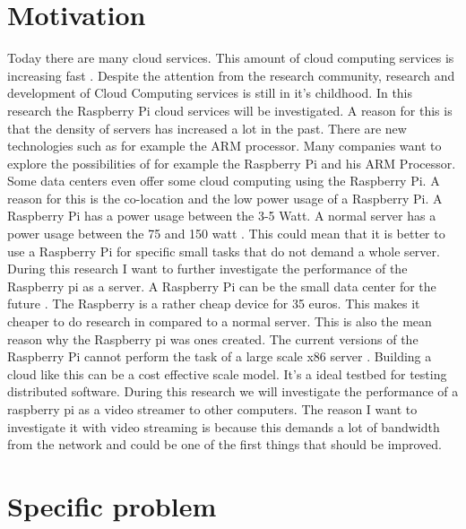 \documentclass{sig-alternate-br}
\begin{document}

\section{Motivation}
Today there are many cloud services. This amount of cloud computing services is increasing fast \cite{armbrust:2009}.  Despite the attention
from the research community, research and development of
Cloud Computing services is still in it's childhood\cite{tso:2013}. 
In this research the Raspberry Pi cloud services will be investigated. A reason for this is that the density of servers has increased a lot in the past\cite{density}. There are new technologies such as for example the ARM processor. Many companies want to explore the possibilities of for example the Raspberry Pi and his ARM Processor. Some data centers even offer some cloud computing using the Raspberry Pi. A reason for this is the co-location and the low power usage of a Raspberry Pi\cite{hosting,Pcextreme}.  A Raspberry Pi has a power usage between the 3-5 Watt. A normal server has a power usage between the 75 and 150 watt \cite{Powerusage}. This could mean that it is better to use a Raspberry Pi for specific small tasks that do not demand a whole server. During this research I want to further investigate the performance of the Raspberry pi as a server.  A Raspberry Pi can be the small data center for the future \cite{tso:2013}. The Raspberry is a rather cheap device for 35 euros. This makes it cheaper to do research in compared to a normal server. This is also the mean reason why the Raspberry pi was ones created. The current versions of the Raspberry Pi cannot perform the task of a large scale x86 server \cite{tso:2013}. Building a cloud like this can be a cost effective scale model\cite{tso:2013}. It's a ideal testbed for testing distributed software. During this research we will investigate the performance of a raspberry pi as a video streamer to other computers. The reason I want to investigate it with video streaming is because this demands a lot of bandwidth from the network and could be one of the first things that should be improved. 

\section{Specific problem}
\end{document}
